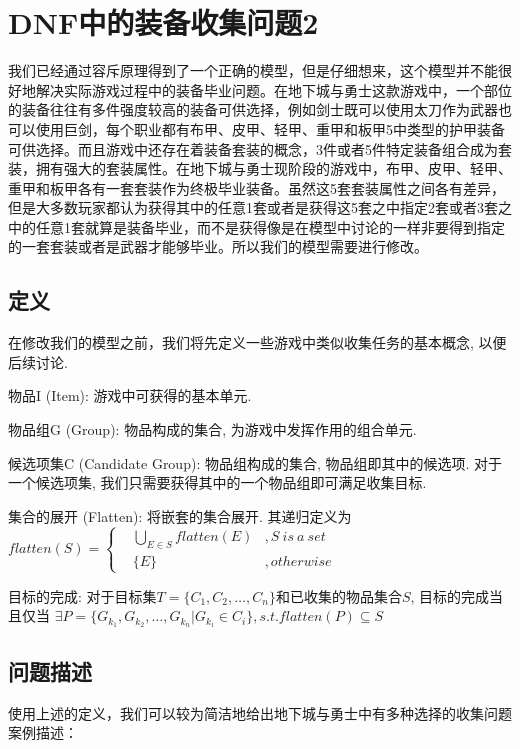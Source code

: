 \documentclass[10pt,journal,compsoc]{IEEEtran}
\begin{document}
\section{DNF中的装备收集问题2}
  我们已经通过容斥原理得到了一个正确的模型，但是仔细想来，这个模型并不能很好地解决实际游戏过程中的装备毕业问题。在地下城与勇士这款游戏中，一个部位的装备往往有多件强度较高的装备可供选择，例如剑士既可以使用太刀作为武器也可以使用巨剑，每个职业都有布甲、皮甲、轻甲、重甲和板甲5中类型的护甲装备可供选择。而且游戏中还存在着装备套装的概念，3件或者5件特定装备组合成为套装，拥有强大的套装属性。在地下城与勇士现阶段的游戏中，布甲、皮甲、轻甲、重甲和板甲各有一套套装作为终极毕业装备。虽然这5套套装属性之间各有差异，但是大多数玩家都认为获得其中的任意1套或者是获得这5套之中指定2套或者3套之中的任意1套就算是装备毕业，而不是获得像是在模型中讨论的一样非要得到指定的一套套装或者是武器才能够毕业。所以我们的模型需要进行修改。

  \subsection{定义}

  在修改我们的模型之前，我们将先定义一些游戏中类似收集任务的基本概念, 以便后续讨论. 
  
  物品I (Item): 游戏中可获得的基本单元.

  物品组G (Group): 物品构成的集合, 为游戏中发挥作用的组合单元.
  
  候选项集C (Candidate Group): 物品组构成的集合, 物品组即其中的候选项. 对于一个候选项集, 我们只需要获得其中的一个物品组即可满足收集目标. 
  

  集合的展开 (Flatten): 将嵌套的集合展开. 其递归定义为
  $
  flatten(S) = \left\{
    \begin{aligned}
      & \bigcup\limits_{E \in S} flatten(E) &, S~is~a~set \\
      & \{E\} &, otherwise
    \end{aligned}
  \right.
  $
  
  目标的完成: 对于目标集$T = \{C_1, C_2, \dots, C_n\}$和已收集的物品集合$S$, 目标的完成当且仅当
  $ \exists P = \{G_{k_1}, G_{k_2}, \dots, G_{k_n} | G_{k_i} \in C_i\}, s.t. flatten(P) \subseteq S$
  
  \vspace{5mm}

  \subsection{问题描述}
  使用上述的定义，我们可以较为简洁地给出地下城与勇士中有多种选择的收集问题案例描述：
  
\end{document}
